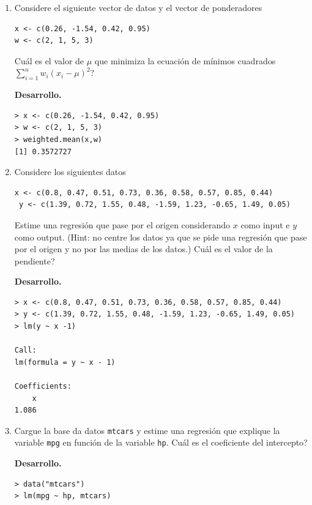 \documentclass[11pt,oneside,spanish]{article}
\theoremstyle{definition}
\theoremstyle{definition}\newtheorem{definicion}{Definicin}
\theoremstyle{definition}\newtheorem{ejemplo}{Ejemplo}
\theoremstyle{remark}\newtheorem{nota}{\textsc{Nota}}
\theoremstyle{definition}\newtheorem{proposicion}{Proposicin}
\theoremstyle{definition}\newtheorem{problema}{Problema}
\begin{document}
\begin{enumerate}[(1)]
\item Considere el siguiente vector de datos y el vector de ponderadores
\begin{lstlisting}[backgroundcolor=\color{Gray!20},frame=none,basicstyle=\ttfamily]
x <- c(0.26, -1.54, 0.42, 0.95)
w <- c(2, 1, 5, 3)
\end{lstlisting}
{\textquestiondown}Cu\'al es el valor de $\mu$ que minimiza la ecuaci\'on de m\'inimos cuadrados $\sum_{i=1}^n w_i(x_i-\mu)^2$?

\newpage 

\textbf{Desarrollo.}
\begin{lstlisting}[backgroundcolor=\color{Gray!20},frame=none,basicstyle=\ttfamily]
> x <- c(0.26, -1.54, 0.42, 0.95)
> w <- c(2, 1, 5, 3)
> weighted.mean(x,w)
[1] 0.3572727
\end{lstlisting}
	
	
\item Considere los siguientes datos
\begin{lstlisting}[backgroundcolor=\color{Gray!20},frame=none,basicstyle=\ttfamily]
 x <- c(0.8, 0.47, 0.51, 0.73, 0.36, 0.58, 0.57, 0.85, 0.44)
 y <- c(1.39, 0.72, 1.55, 0.48, -1.59, 1.23, -0.65, 1.49, 0.05)
\end{lstlisting}
Estime una regresi\'on que pase por el origen considerando $x$ como input e $y$ como output. (Hint: no centre los datos ya que se pide una regresi\'on 	que pase por el origen y no por las medias de los datos.)
{\textquestiondown}Cu\'al es el valor de la pendiente?

\textbf{Desarrollo.}
\begin{lstlisting}[backgroundcolor=\color{Gray!20},frame=none,basicstyle=\ttfamily]
> x <- c(0.8, 0.47, 0.51, 0.73, 0.36, 0.58, 0.57, 0.85, 0.44)
> y <- c(1.39, 0.72, 1.55, 0.48, -1.59, 1.23, -0.65, 1.49, 0.05)
> lm(y ~ x -1)

Call:
lm(formula = y ~ x - 1)

Coefficients:
    x  
1.086
\end{lstlisting}
	
		
\item Cargue la  base da datos \texttt{mtcars} y estime una regresi\'on que explique la variable \texttt{mpg} en funci\'on de la variable \texttt{hp}. {\textquestiondown}Cu\'al es el coeficiente del intercepto?	

\textbf{Desarrollo.}
\begin{lstlisting}[backgroundcolor=\color{Gray!20},frame=none,basicstyle=\ttfamily]
> data("mtcars")
> lm(mpg ~ hp, mtcars)


\end{lstlisting}
\end{enumerate}
\end{document}
